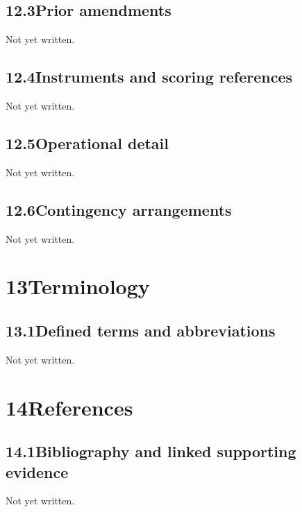\documentclass[11pt,a4paper]{article}
\newcommand{\psnote}[2]{\par\noindent\colorbox{#1!8}{\parbox{\dimexpr\linewidth-2\fboxsep}{\small\color{#1}#2}}\par}
\begin{document}
\subsection{12.3\quad Prior amendments}\label{section.12.3}
\psnote{pswarn}{Not yet written.}
\subsection{12.4\quad Instruments and scoring references}\label{section.12.4}
\psnote{pswarn}{Not yet written.}
\subsection{12.5\quad Operational detail}\label{section.12.5}
\psnote{pswarn}{Not yet written.}
\subsection{12.6\quad Contingency arrangements}\label{section.12.6}
\psnote{pswarn}{Not yet written.}
\section{13\quad Terminology}\label{section.13}
\subsection{13.1\quad Defined terms and abbreviations}\label{section.13.1}
\psnote{pswarn}{Not yet written.}
\section{14\quad References}\label{section.14}
\subsection{14.1\quad Bibliography and linked supporting evidence}\label{section.14.1}
\psnote{pswarn}{Not yet written.}
\end{document}
